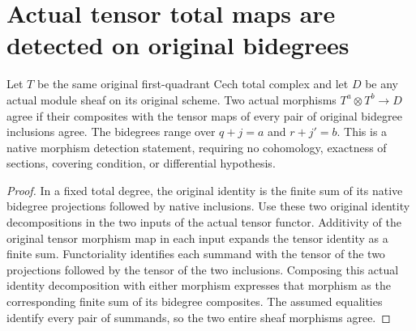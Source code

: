 \section{Actual tensor total maps are detected on original bidegrees}

\begin{theorem}
\label{thm:di-cech-total-tensor-ext}
\leanok
{}
Let $T$ be the same original first-quadrant Cech total complex and
let $D$ be any actual module sheaf on its original scheme. Two actual
morphisms $T^a\otimes T^b\to D$ agree if their composites with the
tensor maps of every pair of original bidegree inclusions agree.
The bidegrees range over $q+j=a$ and $r+j'=b$. This is a native
morphism detection statement, requiring no cohomology, exactness of
sections, covering condition, or differential hypothesis.
\end{theorem}
\begin{proof}
In a fixed total degree, the original identity is the finite sum of
its native bidegree projections followed by native inclusions.
Use these two original identity decompositions in the two inputs
of the actual tensor functor. Additivity of the original tensor
morphism map in each input expands the tensor identity as a finite
sum. Functoriality identifies each summand with the tensor of the
two projections followed by the tensor of the two inclusions.
Composing this actual identity decomposition with either morphism
expresses that morphism as the corresponding finite sum of its
bidegree composites. The assumed equalities identify every pair of
summands, so the two entire sheaf morphisms agree.
\end{proof}
